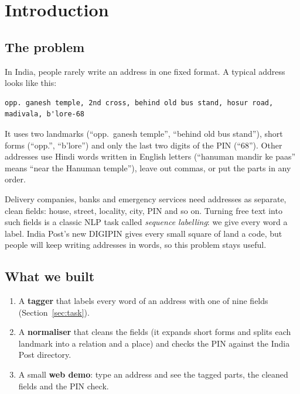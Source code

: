 \documentclass[11pt,a4paper]{article}
\begin{document}
\clearpage
\setcounter{tocdepth}{1}
\tableofcontents
\listoftables
\listoffigures
\clearpage

\pagestyle{main}

\section{Introduction}

\subsection{The problem}
In India, people rarely write an address in one fixed format. A typical address looks like this:
\begin{lstlisting}
opp. ganesh temple, 2nd cross, behind old bus stand, hosur road, madivala, b'lore-68
\end{lstlisting}
It uses two landmarks (``opp.\ ganesh temple'', ``behind old bus stand''), short forms (``opp.'', ``b'lore'') and only
the last two digits of the PIN (``68''). Other addresses use Hindi words written in English letters (``hanuman mandir
ke paas'' means ``near the Hanuman temple''), leave out commas, or put the parts in any order.

Delivery companies, banks and emergency services need addresses as separate, clean fields: house, street, locality,
city, PIN and so on. Turning free text into such fields is a classic NLP task called \emph{sequence labelling}: we give
every word a label. India Post's new DIGIPIN gives every small square of land a code, but people will keep writing
addresses in words, so this problem stays useful.

\subsection{What we built}
\begin{enumerate}
\item A \textbf{tagger} that labels every word of an address with one of nine fields (Section~\ref{sec:task}).
\item A \textbf{normaliser} that cleans the fields (it expands short forms and splits each landmark into a relation
and a place) and checks the PIN against the India Post directory.
\item A small \textbf{web demo}: type an address and see the tagged parts, the cleaned fields and the PIN check.
\end{enumerate}
\end{document}
